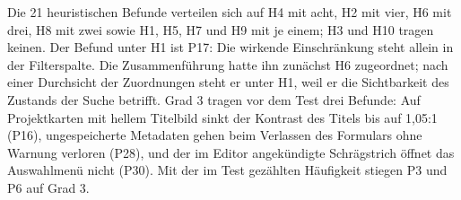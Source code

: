 Die 21 heuristischen Befunde verteilen sich auf H4 mit acht, H2 mit vier, H6 mit drei, H8 mit zwei sowie H1, H5, H7 und H9 mit je einem; H3 und H10 tragen keinen. Der Befund unter H1 ist P17: Die wirkende Einschränkung steht allein in der Filterspalte. Die Zusammenführung hatte ihn zunächst H6 zugeordnet; nach einer Durchsicht der Zuordnungen steht er unter H1, weil er die Sichtbarkeit des Zustands der Suche betrifft. Grad 3 tragen vor dem Test drei Befunde: Auf Projektkarten mit hellem Titelbild sinkt der Kontrast des Titels bis auf 1,05:1 (P16), ungespeicherte Metadaten gehen beim Verlassen des Formulars ohne Warnung verloren (P28), und der im Editor angekündigte Schrägstrich öffnet das Auswahlmenü nicht (P30). Mit der im Test gezählten Häufigkeit stiegen P3 und P6 auf Grad 3.
